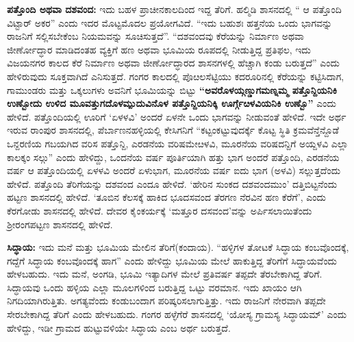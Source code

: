 \textbf{ಪತ್ತೊಂದಿ ಅಥವಾ ದಶವಂದ:} ಇದು ಬಹಳ ಪ್ರಾಚೀನಕಾಲದಿಂದ ಇದ್ದ ತೆರಿಗೆ. ಹಲ್ಮಿಡಿ ಶಾಸನದಲ್ಲಿ “ ಆ ಪತ್ತೊಂದಿ ವಿಟ್ಟಾರ್​ ಅಕರ” ಎಂದು ಇದರ ಮೊಟ್ಟಮೊದಲ ಪ್ರಯೋಗವಿದೆ. “ಇದು ಬಹುಶಃ ಹತ್ತನೆಯ ಒಂದು ಭಾಗವನ್ನು ರಾಜನಿಗೆ ಸಲ್ಲಿಸಬೇಕೆಂಬ ನಿಯಮವನ್ನು ಸೂಚಿಸುತ್ತದೆ”. “ದಶವಂದವು ಕೆರೆಯನ್ನು ನಿರ್ಮಾಣ ಅಥವಾ ಜೀರ್ಣೋದ್ಧಾರ ಮಾಡಿದಂತಹ ವ್ಯಕ್ತಿಗೆ ಹಣ ಅಥವಾ ಭೂಮಿಯ ರೂಪದಲ್ಲಿ ನೀಡುತ್ತಿದ್ದ ಪ್ರತಿಫಲ, ಇದು ವಿಜಯನಗರ ಕಾಲದ ಕೆರೆ ನಿರ್ಮಾಣ ಅಥವಾ ಜೀರ್ಣೋದ್ಧಾರದ ಶಾಸನಗಳಲ್ಲಿ ಹೆಚ್ಚಾಗಿ ಕಂಡು ಬರುತ್ತದೆ” ಎಂದು ಹೇಳಿರುವುದು ಸೂಕ್ತವಾಗಿದೆ ಎನಿಸುತ್ತದೆ. ಗಂಗರ ಕಾಲದಲ್ಲಿ ಪೊೞಲಸೆಟ್ಟಿಯು ಕದರೂರಿನಲ್ಲಿ ಕೆರೆಯನ್ನು ಕಟ್ಟಿಸಿದಾಗ, ಗಾಮುಂಡರು ಮತ್ತು ಒಕ್ಕಲುಗಳು ಅವನಿಗೆ ಭೂಮಿಯನ್ನು ಬಿಟ್ಟು \textbf{“ಅವರೊಳಯ್ಗಣ್ಡುಗಮಣ್ನಮ್ಮ ಪತ್ತೊನ್ದಿಯನಿಕಿ ಉಣ್ಬೋದು ಉಳಿದ ಮೂವತ್ತುಗದೊಳಮ್ಪುದುವಿನೊಳ ಪತ್ತೊನ್ದಿಯನಿಕ್ಕಿ ಊರ್ಗ್ಗೆೞಳವಿಯನಿಕಿ ಉಣ್ಬೊ”} ಎಂದು ಹೇಳಿದೆ. ಪತ್ತೊಂದಿಯಲ್ಲಿ ಊರಿಗೆ ‘ಏಳಳವಿ’ ಅಂದರೆ ಏಳನೇ ಒಂದು ಭಾಗವನ್ನು ನೀಡುವಂತೆ ಹೇಳಿದೆ. ಇದೇ ಅರ್ಥ ಇರುವ ರಾಂಪುರ ಶಾಸನದಲ್ಲಿ, ಪೆರ್ಬಾಣನಹಳ್ಳಿಯಲ್ಲಿ ಕೇಸಿಗನಿಗೆ “ಕಟ್ಟಂಕಟ್ಟುವುದರ್ಕ್ಕೆ ಕೊಟ್ಟ ಸ್ಥಿತಿ ಕ್ರಮವೆನ್ತೆನ್ದೊಡೆ ಒನ್ದರಣಿಯ ಗಬಯಗಿದ ವರಿಸ ಪತ್ತೊನ್ದಿ, ಎರಡನೆಯ ವರಿಷಮೇೞಳವಿ, ಮೂರನೆಯ ವರಿಷದನ್ದಿಗೆ ಅಯ್ದಳವಿ ಎಲ್ಲಾ ಕಾಲಕ್ಕಂ ಸಲ್ಗು” ಎಂದು ಹೇಳಿದ್ದು, ಒಂದನೆಯ ವರ್ಷ ಪೂರ್ತಿಯಾಗಿ ಹತ್ತು ಭಾಗ ಅಂದರೆ ಪತ್ತೊಂದಿ, ಎರಡನೆಯ ವರ್ಷ ಆ ಪತ್ತೊಂದಿಯಲ್ಲಿ ಏಳಳವಿ ಅಂದರೆ ಏಳುಭಾಗ, ಮೂರನೆಯ ವರ್ಷ ಐದು ಭಾಗ (ಅಳವಿ) ಸಲ್ಲುತ್ತದೆಂದು ಹೇಳಿದೆ. ಪತ್ತೊಂದಿ ತೆರಿಗೆಯನ್ನು ದಶವಂದ ಎಂದೂ ಹೇಳಿದೆ. ‘ಹೇರಿನ ಸುಂಕದ ದಶವಂದಮುಂ’ ದತ್ತಿಬಿಟ್ಟನೆಂದು ಹಟ್ಟಣ ಶಾಸನದಲ್ಲಿ ಹೇಳಿದೆ. ‘ತೂಬಿನ ಕೆಲಸಕ್ಕೆ ಹಾಕಿದ ಭೂದಸವಂದ ತೆರಗಣ ನೆರವಿನ ಹಣ ಕೆರೆಗೆ’, ಎಂದು ಕೆರಗೋಡು ಶಾಸನದಲ್ಲಿ ಹೇಳಿದೆ. ದೇವರ ಕೈಂಕರ್ಯಕ್ಕೆ ‘ಮತ್ತೂರ ದಸವಂದ’ವನ್ನು ಅರ್ಪಿಸಲಾಯಿತೆಂದು ಶ‍್ರೀರಂಗಪಟ್ಟಣ ಶಾಸನದಲ್ಲಿ ಹೇಳಿದೆ.

\textbf{ಸಿದ್ಧಾಯ:} ಇದು ಮನೆ ಮತ್ತು ಭೂಮಿಯ ಮೇಲಿನ ತೆರಿಗೆ(ಕಂದಾಯ). “ಹಳ್ಳಿಗಳ ತೋಟಕೆ ಸಿದ್ಧಾಯ ಕಂಬವೊಂದಕ್ಕೆ, ಗದ್ದೆಗೆ ಸಿದ್ಧಾಯ ಕಂಬವೊಂದಕ್ಕೆ ಹಾಗ” ಎಂದು ಹೇಳಿದ್ದು ಭೂಮಿಯ ಮೇಲೆ ಹಾಕುತ್ತಿದ್ದ ತೆರಿಗೆಗೆ ಸಿದ್ಧಾಯವೆಂದು ಹೇಳಬಹುದು. ಇದು ಮನೆ, ಅಂಗಡಿ, ಭೂಮಿ ಇತ್ಯಾದಿಗಳ ಮೇಲೆ ಪ್ರತಿವರ್ಷ ತಪ್ಪದೇ ತೆರಬೇಕಾಗಿದ್ದ ತೆರಿಗೆ. ಸಿದ್ಧಾಯವು ಒಂದು ಹಳ್ಳಿಯ ಎಲ್ಲಾ ಮೂಲಗಳಿಂದ ಬರುತ್ತಿದ್ದ ಒಟ್ಟು ವರಮಾನ. ಇದು ಖಾಯಂ ಆಗಿ ನಿಗದಿಯಾಗಿರುತ್ತಿತು. ಅಗತ್ಯವೆಂದು ಕಂಡುಬಂದಾಗ ಪರಿಷ್ಕರಿಸಲಾಗುತ್ತಿತ್ತು. ಇದು ರಾಜನಿಗೆ ನೇರವಾಗಿ ತಪ್ಪದೇ ಸೇರಬೇಕಾಗಿದ್ದ ತೆರಿಗೆ ಎಂದು ಹೇಳಬಹುದು. ಗಂಗರ ಹಳ್ಳೆಗೆರೆ ಶಾಸನದಲ್ಲಿ ‘ಯೋಸ್ಯ ಗ್ರಾಮಸ್ಯ ಸಿದ್ಧಾಯಮ್’ ಎಂದು ಹೇಳಿದ್ದು, ಇಡೀ ಗ್ರಾಮದ ಹುಟ್ಟುವಳಿಯೇ ಸಿದ್ಧಾಯ ಎಂಬ ಅರ್ಥ ಬರುತ್ತದೆ.

